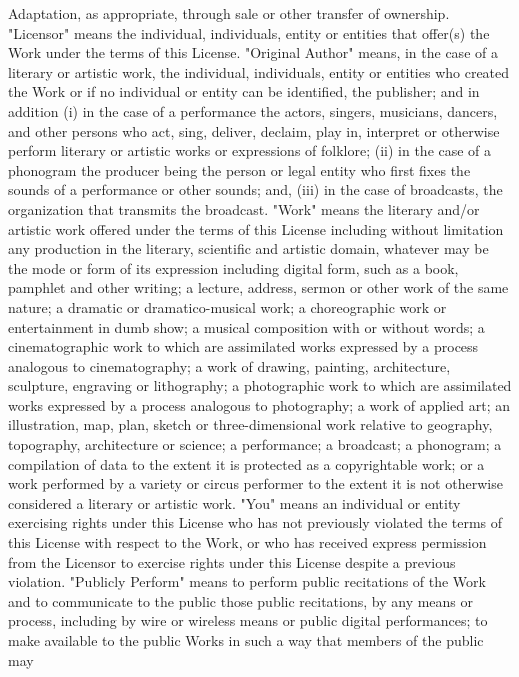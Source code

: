 \documentclass[oneside]{book}
\begin{document}
Adaptation, as appropriate, through sale or other transfer of ownership.
"Licensor" means the individual, individuals, entity or entities that offer(s)
the Work under the terms of this License.  "Original Author" means, in the case
of a literary or artistic work, the individual, individuals, entity or entities
who created the Work or if no individual or entity can be identified, the
publisher; and in addition (i) in the case of a performance the actors, singers,
musicians, dancers, and other persons who act, sing, deliver, declaim, play in,
interpret or otherwise perform literary or artistic works or expressions of
folklore; (ii) in the case of a phonogram the producer being the person or legal
entity who first fixes the sounds of a performance or other sounds; and, (iii)
in the case of broadcasts, the organization that transmits the broadcast.
"Work" means the literary and/or artistic work offered under the terms of this
License including without limitation any production in the literary, scientific
and artistic domain, whatever may be the mode or form of its expression
including digital form, such as a book, pamphlet and other writing; a lecture,
address, sermon or other work of the same nature; a dramatic or
dramatico-musical work; a choreographic work or entertainment in dumb show; a
musical composition with or without words; a cinematographic work to which are
assimilated works expressed by a process analogous to cinematography; a work of
drawing, painting, architecture, sculpture, engraving or lithography; a
photographic work to which are assimilated works expressed by a process
analogous to photography; a work of applied art; an illustration, map, plan,
sketch or three-dimensional work relative to geography, topography, architecture
or science; a performance; a broadcast; a phonogram; a compilation of data to
the extent it is protected as a copyrightable work; or a work performed by a
variety or circus performer to the extent it is not otherwise considered a
literary or artistic work.  "You" means an individual or entity exercising
rights under this License who has not previously violated the terms of this
License with respect to the Work, or who has received express permission from
the Licensor to exercise rights under this License despite a previous violation.
"Publicly Perform" means to perform public recitations of the Work and to
communicate to the public those public recitations, by any means or process,
including by wire or wireless means or public digital performances; to make
available to the public Works in such a way that members of the public may
\end{document}
